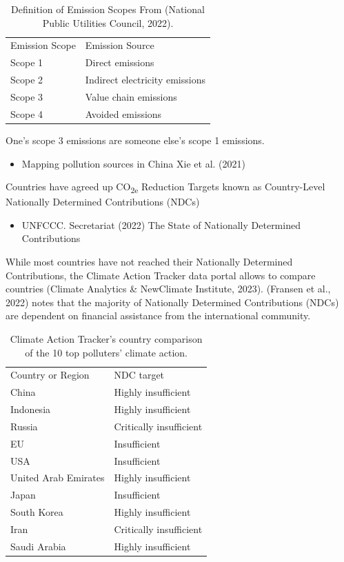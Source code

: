 \documentclass[
  letterpaper,
  DIV=11,
  numbers=noendperiod]{scrartcl}
\providecommand{\tightlist}{%
  \setlength{\itemsep}{0pt}\setlength{\parskip}{0pt}}\usepackage{longtable,booktabs,array}
\begin{document}
\begin{longtable}[]{@{}ll@{}}
\caption{Definition of Emission Scopes From (National Public Utilities
Council, 2022).}\tabularnewline
\toprule\noalign{}
\endfirsthead
\endhead
\bottomrule\noalign{}
\endlastfoot
Emission Scope & Emission Source \\
Scope 1 & Direct emissions \\
Scope 2 & Indirect electricity emissions \\
Scope 3 & Value chain emissions \\
Scope 4 & Avoided emissions \\
\end{longtable}

One's scope 3 emissions are someone else's scope 1 emissions.

\begin{itemize}
\tightlist
\item
  Mapping pollution sources in China Xie et al. (2021)
\end{itemize}

Countries have agreed up CO\textsubscript{2e} Reduction Targets known as
Country-Level Nationally Determined Contributions (NDCs)

\begin{itemize}
\tightlist
\item
  UNFCCC. Secretariat (2022) The State of Nationally Determined
  Contributions
\end{itemize}

While most countries have not reached their Nationally Determined
Contributions, the Climate Action Tracker data portal allows to compare
countries (Climate Analytics \& NewClimate Institute, 2023). (Fransen et
al., 2022) notes that the majority of Nationally Determined
Contributions (NDCs) are dependent on financial assistance from the
international community.

\begin{longtable}[]{@{}ll@{}}
\caption{Climate Action Tracker's country comparison of the 10 top
polluters' climate action.}\tabularnewline
\toprule\noalign{}
\endfirsthead
\endhead
\bottomrule\noalign{}
\endlastfoot
Country or Region & NDC target \\
China & Highly insufficient \\
Indonesia & Highly insufficient \\
Russia & Critically insufficient \\
EU & Insufficient \\
USA & Insufficient \\
United Arab Emirates & Highly insufficient \\
Japan & Insufficient \\
South Korea & Highly insufficient \\
Iran & Critically insufficient \\
Saudi Arabia & Highly insufficient \\
\end{longtable}
\end{document}
